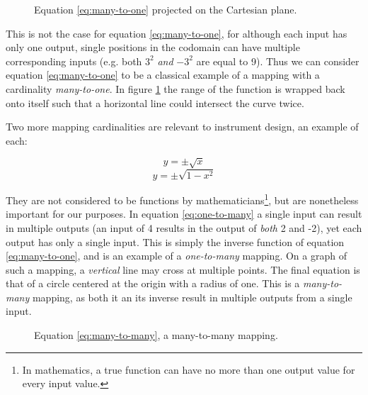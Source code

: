 \begin{figure}[h]
	\centering
\caption{Equation \ref{eq:many-to-one} projected on the Cartesian plane.}
\label{fig:many-to-one_graph}
\end{figure}

This is not the case for equation \ref{eq:many-to-one}, for although each input has only one output, single positions in the codomain can have multiple corresponding inputs (e.g. both $3^2$ \emph{and} $-3^2$ are equal to 9). Thus we can consider equation \ref{eq:many-to-one} to be a classical example of a mapping with a cardinality \emph{many-to-one}. In figure \ref{fig:many-to-one_graph} the range of the function is wrapped back onto itself such that a horizontal line could intersect the curve twice.

Two more mapping cardinalities are relevant to instrument design, an example of each:  

\begin{equation} y = \pm\sqrt{x} \label{eq:one-to-many} \end{equation} 
\begin{equation} y = \pm\sqrt{1 - x^2} \label{eq:many-to-many} \end{equation} 

They are not considered to be functions by mathematicians\footnote{In mathematics, a true function can have no more than one output value for every input value.}, but are nonetheless important for our purposes. In equation \ref{eq:one-to-many} a single input can result in multiple outputs (an input of 4 results in the output of \emph{both} 2 and -2), yet each output has only a single input. This is simply the inverse function of equation \ref{eq:many-to-one}, and is an example of a \emph{one-to-many} mapping. On a graph of such a mapping, a \emph{vertical} line may cross at multiple points. The final equation is that of a circle centered at the origin with a radius of one. This is a \emph{many-to-many} mapping, as both it an its inverse result in multiple outputs from a single input.

\begin{figure}[ht]
	\centering
\caption{Equation \ref{eq:many-to-many}, a many-to-many mapping.}
\end{figure}

